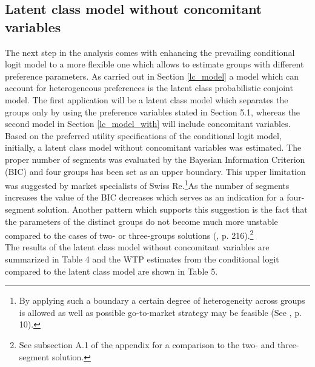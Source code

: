 \documentclass[12pt, abstracton]{article}
\begin{document}
\subsection{Latent class model without concomitant variables}
\label{lc_model_without}
The next step in the analysis comes with enhancing the prevailing conditional logit model to a more flexible one which allows to estimate groups with different preference parameters. As carried out in Section \ref{lc_model} a model which can account for heterogeneous preferences is the latent class probabilistic conjoint model. The first application will be a latent class model which separates the groups only by using the preference variables stated in Section 5.1, whereas the second model in Section \ref{lc_model_with} will include concomitant variables.\\
Based on the preferred utility specifications of the conditional logit model, initially, a latent class model without concomitant variables was estimated. The proper number of segments was evaluated by the Bayesian Information Criterion (BIC) and four groups has been set as an upper boundary. This upper limitation was suggested by market specialists of Swiss Re.\footnote{By applying such a boundary a certain degree of heterogeneity across groups is allowed as well as possible go-to-market strategy may be feasible (See \cite{Rischatsch2016}, p. 10).}As the number of segments increases the value of the BIC decreases which serves as an indication for a four-segment solution. Another pattern which supports this suggestion is the fact that the parameters of the distinct groups do not become much more unstable compared to the cases of two- or three-groups solutions (\cite{S.C.Lai2010}, p. 216).\footnote{See subsection A.1 of the appendix for a comparison to the two- and three-segment solution.}\\
The results of the latent class model without concomitant variables are summarized in Table 4 and the WTP estimates from the conditional logit compared to the latent class model are shown in Table 5.
\end{document}
